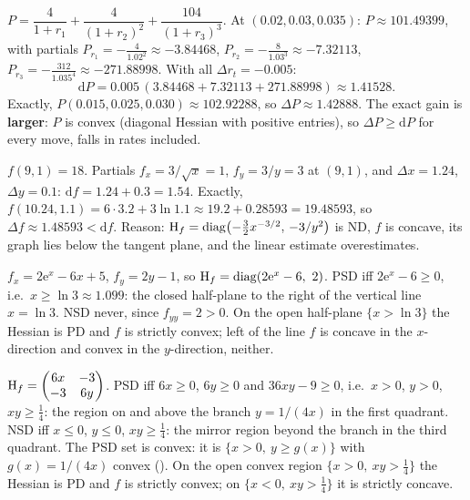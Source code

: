 \begin{solutions}
  \item $P=\dfrac{4}{1+r_1}+\dfrac{4}{(1+r_2)^{2}}+\dfrac{104}{(1+r_3)^{3}}$.
        At $(0.02,0.03,0.035)$: $P\approx101.49399$, with partials
        $P_{r_1}=-\tfrac{4}{1.02^{2}}\approx-3.84468$,
        $P_{r_2}=-\tfrac{8}{1.03^{3}}\approx-7.32113$,
        $P_{r_3}=-\tfrac{312}{1.035^{4}}\approx-271.88998$. With all
        $\Delta r_t=-0.005$:
        \[
          \mathrm{d}P=0.005\,(3.84468+7.32113+271.88998)\approx1.41528 .
        \]
        Exactly, $P(0.015,0.025,0.030)\approx102.92288$, so
        $\Delta P\approx1.42888$. The exact gain is \textbf{larger}: $P$ is
        convex (diagonal Hessian with positive entries), so
        $\Delta P\ge\mathrm{d}P$ for every move, falls in rates included.

  \item $f(9,1)=18$. Partials $f_x=3/\sqrt{x}=1$, $f_y=3/y=3$ at $(9,1)$,
        and $\Delta x=1.24$, $\Delta y=0.1$:
        $\mathrm{d}f=1.24+0.3=1.54$. Exactly,
        $f(10.24,1.1)=6\cdot3.2+3\ln1.1\approx19.2+0.28593=19.48593$, so
        $\Delta f\approx1.48593<\mathrm{d}f$. Reason:
        $\operatorname{H}_f=\operatorname{diag}\bigl(-\tfrac32x^{-3/2},\,-3/y^{2}\bigr)$
        is ND, $f$ is concave, its graph lies below the tangent plane, and
        the linear estimate overestimates.

  \item $f_x=2\mathrm{e}^{x}-6x+5$, $f_y=2y-1$, so
        $\Hess_f=\operatorname{diag}(2\mathrm{e}^{x}-6,\ 2)$. PSD iff
        $2\mathrm{e}^{x}-6\ge0$, i.e.\ $x\ge\ln3\approx1.099$: the closed
        half-plane to the right of the vertical line $x=\ln3$. NSD never,
        since $f_{yy}=2>0$. On the open half-plane $\{x>\ln3\}$ the Hessian
        is PD and $f$ is strictly convex; left of the line $f$ is concave in
        the $x$-direction and convex in the $y$-direction, neither.

  \item $\operatorname{H}_f=\begin{pmatrix}6x&-3\\-3&6y\end{pmatrix}$. PSD iff
        $6x\ge0$, $6y\ge0$ and $36xy-9\ge0$, i.e.\ $x>0$, $y>0$,
        $xy\ge\tfrac14$: the region on and above the branch $y=1/(4x)$ in
        the first quadrant. NSD iff $x\le0$, $y\le0$, $xy\ge\tfrac14$: the
        mirror region beyond the branch in the third quadrant. The PSD set
        is convex: it is $\{x>0,\ y\ge g(x)\}$ with $g(x)=1/(4x)$ convex
        (). On the open convex region $\{x>0,\ xy>\tfrac14\}$ the
        Hessian is PD and $f$ is strictly convex; on
        $\{x<0,\ xy>\tfrac14\}$ it is strictly concave.


\end{solutions}
